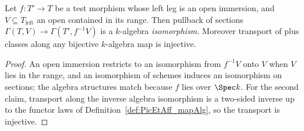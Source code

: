 \begin{lemma}
  \label{lem:appLEAlgEquiv}
  \leanok
  Let \(f \colon T' \to T\) be a test morphism whose left leg is an open immersion, and
  \(V \subseteq T_{\mathrm{left}}\) an open contained in its range. Then pullback of sections
  \(\Gamma(T,V) \to \Gamma(T', f^{-1}V)\) is a \(k\)-algebra \emph{isomorphism}. Moreover
  transport of plus classes along any bijective \(k\)-algebra map is injective.
\end{lemma}
\begin{proof}
  \leanok
  An open immersion restricts to an isomorphism from \(f^{-1}V\) onto \(V\) when
  \(V\) lies in the range, and an isomorphism of schemes induces an isomorphism on sections;
  the algebra structures match because \(f\) lies over \(\Spec k\). For the second claim,
  transport along the inverse algebra isomorphism is a two-sided inverse up to the functor
  laws of Definition~\ref{def:PicEtAff_mapAlg}, so the transport is injective.
\end{proof}

